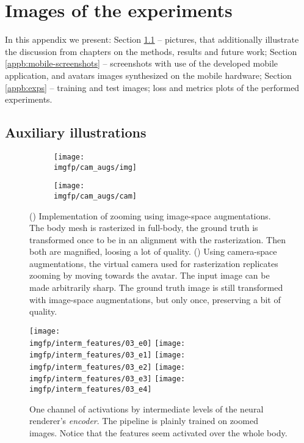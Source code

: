 \chapter{Images of the experiments}
In this appendix we present: Section \ref{appb:aux} -- pictures, that additionally illustrate the discussion from chapters on the methods, results and future work; Section \ref{appb:mobile-screenshots} -- screenshots with use of the developed mobile application, and avatars images synthesized on the mobile hardware; Section \ref{appb:exps} -- training and test images; loss and metrics plots of the performed experiments.
\section{Auxiliary illustrations}
\label{appb:aux}
\begin{figure}[!h]
	\centering
	\begin{subfigure}[b]{0.48\textwidth}
		\centering
		\texttt{[image: \\imgfp/cam\_augs/img]}%
		\caption{}
		\label{appb:cam_aug:before}
	\end{subfigure}
	\begin{subfigure}[b]{0.48\textwidth}
		\centering
		\texttt{[image: \\imgfp/cam\_augs/cam]}%
		\caption{}
		\label{appb:cam_aug:after}
	\end{subfigure}
	\caption{(\protect{}) Implementation of zooming using image-space augmentations. The body mesh is rasterized in full-body, the ground truth is transformed once to be in an alignment with the rasterization. Then both are magnified, loosing a lot of quality. (\protect{}) Using camera-space augmentations, the virtual camera used for rasterization replicates zooming by moving towards the avatar. The input image can be made arbitrarily sharp. The ground truth image is still transformed with image-space augmentations, but only once, preserving a bit of quality. }
	\label{aux:cam_aug}
\end{figure}
\begin{figure}
	\centering
	\texttt{[image: \\imgfp/interm\_features/03\_e0]}%
	\hfill\texttt{[image: \\imgfp/interm\_features/03\_e1]}%
	\hfill\texttt{[image: \\imgfp/interm\_features/03\_e2]}%
	\hfill\texttt{[image: \\imgfp/interm\_features/03\_e3]}%
	\hfill\texttt{[image: \\imgfp/interm\_features/03\_e4]}%
	\caption{One channel of activations by intermediate levels of the neural renderer's \textit{encoder}. The pipeline is plainly trained on zoomed images. Notice that the features seem activated over the whole body.}
	\label{aux:interm03_encoder}
\end{figure}
